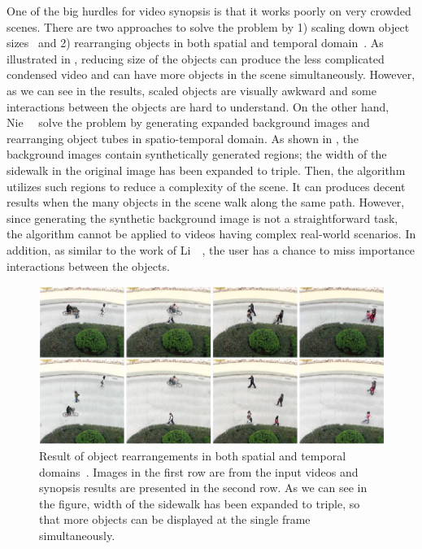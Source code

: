 \documentclass[11pt]{hyu_thesis}
\begin{document}
One of the big hurdles for video synopsis is that it works poorly on very crowded scenes. There are two approaches to solve the problem by 1) scaling down object sizes~\cite{Li2016a} and 2) rearranging objects in both spatial and temporal domain~\cite{Nie2014}. As illustrated in , reducing size of the objects can produce the less complicated condensed video and can have more objects in the scene simultaneously. However, as we can see in the results, scaled objects are visually awkward and some interactions between the objects are hard to understand. On the other hand, Nie~\etal~\cite{Nie2014} solve the problem by generating expanded background images and rearranging object tubes in spatio-temporal domain. As shown in , the background images contain synthetically generated regions; the width of the sidewalk in the original image has been expanded to triple. Then, the algorithm utilizes such regions to reduce a complexity of the scene. It can produces decent results when the many objects in the scene walk along the same path. However, since generating the synthetic background image is not a straightforward task, the algorithm cannot be applied to videos having complex real-world scenarios. In addition, as similar to the work of Li~\etal~\cite{Li2016a}, the user has a chance to miss importance interactions between the objects.

\begin{figure}
	\centering
	\includegraphics[width=0.95\linewidth]{ext-nie.png}
	\caption{Result of object rearrangements in both spatial and temporal domains~\cite{Nie2014}. Images in the first row are from the input videos and synopsis results are presented in the second row. As we can see in the figure, width of the sidewalk has been expanded to triple, so that more objects can be displayed at the single frame simultaneously.}
	\label{fig:Nie}
\end{figure}
\end{document}
